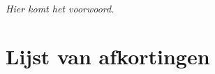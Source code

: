 \textit{Hier komt het voorwoord.}


%
%

\setlength\cftpartnumwidth{2em}

\newpage
\tableofcontents

\newpage


%
%

\listoffigures


%
%

\lstlistoflistings


%
%

\chapter*{Lijst van afkortingen}

